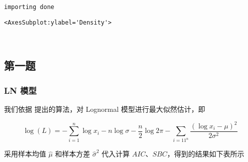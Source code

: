 \documentclass[11pt]{article}
\makeatletter
\newcommand{\boxspacing}{\kern\kvtcb@left@rule\kern\kvtcb@boxsep}
\newcommand{\prompt}[4]{
        {\ttfamily\llap{{\color{#2}[#3]:\hspace{3pt}#4}}\vspace{-\baselineskip}}
    }
\makeatother
\begin{document}
    \begin{Verbatim}[commandchars=\\\{\}]
importing done
    \end{Verbatim}

            \begin{tcolorbox}[breakable, size=fbox, boxrule=.5pt, pad at break*=1mm, opacityfill=0]
\prompt{Out}{outcolor}{1}{\boxspacing}
\begin{Verbatim}[commandchars=\\\{\}]
<AxesSubplot:ylabel='Density'>
\end{Verbatim}
\end{tcolorbox}

    \begin{center}
    \end{center}
    { \hspace*{\fill} \\}

    \hypertarget{ux7b2cux4e00ux9898}{%
\subsection{第一题}\label{ux7b2cux4e00ux9898}}

\hypertarget{ln-ux6a21ux578b}{%
\subsubsection{LN 模型}\label{ln-ux6a21ux578b}}

我们依据\cite{wang2020corrected} 提出的算法，对 Lognormal
模型进行最大似然估计，即

\[
\log(L) = -\sum_{i=1}^n\log x_i-n\log\sigma-\frac{n}{2}\log 2\pi - \sum_{i=11^n}\frac{(\log x_i-\mu)^2}{2\sigma^2}
\]

采用样本均值 \(\hat\mu\) 和样本方差 \(\hat\sigma^2\) 代入计算
\(AIC\)、\(SBC\)，得到的结果如下表所示
\end{document}
